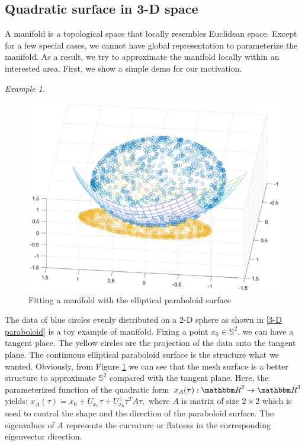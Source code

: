 \documentclass{article}
\theoremstyle{remark}
\newtheorem{example}{Example}
\begin{document}
\subsection{Quadratic surface in 3-D space}
A manifold is a topological space that locally resembles Euclidean space. Except for a few special cases, we cannot have global representation to parameterize the manifold. As a result, we try to approximate the manifold locally within an interested area. First, we show a simple demo for our motivation.
\begin{example}
\begin{figure}[H] %
   \centering
   \includegraphics[width=0.7\linewidth]{demo.eps} 
   \vspace{-0.4cm}
   \caption{ Fitting a manifold with the elliptical paraboloid surface}
   \label{3-D paraboloid}
\end{figure}
The data of blue circles evenly distributed on a 2-D sphere as shown in \eqref{3-D paraboloid} is a toy example of manifold. Fixing a point $x_0\in {\mathbb S}^2$, we can have a tangent place. The yellow circles are the projection of the data onto the tangent plane. The continuous elliptical paraboloid surface is the structure what we wanted.
Obviously, from Figure \ref{3-D paraboloid} we can see that the mesh surface is a better structure to approximate $\mathbb{S}^2$ compared with the tangent plane. Here,  the parameterized function of the quadratic form  $x_A(\tau): {\mathbbm R}^2\rightarrow {\mathbbm R}^3$ yields:
$
x_A(\tau) = x_0 + U_{x_0} \tau + {U_{x_0}^\perp} \tau^T A \tau,
$
where $A$ is matrix of size $2\times 2$ which is used to control the shape and the direction of the paraboloid surface. The eigenvalues of $A$ represents the curvature or flatness in the corresponding eigenvector direction.
\end{example}
\end{document}
